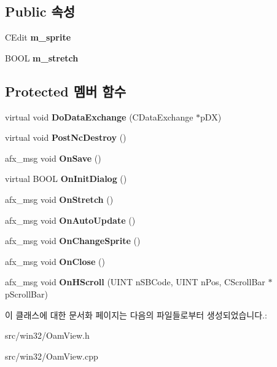 \subsection*{Public 속성}
\begin{DoxyCompactItemize}
\item 
\mbox{\label{class_oam_view_a808b936a1493d14a2a4bf27f3030af14}} 
C\+Edit {\bfseries m\+\_\+sprite}
\item 
\mbox{\label{class_oam_view_a0eeb8a1eeda8d53816c2696d70d61da4}} 
B\+O\+OL {\bfseries m\+\_\+stretch}
\end{DoxyCompactItemize}
\subsection*{Protected 멤버 함수}
\begin{DoxyCompactItemize}
\item 
\mbox{\label{class_oam_view_a0f3152b720294d92994d5240523fa64e}} 
virtual void {\bfseries Do\+Data\+Exchange} (C\+Data\+Exchange $\ast$p\+DX)
\item 
\mbox{\label{class_oam_view_ade58501064b40396703757df105b944b}} 
virtual void {\bfseries Post\+Nc\+Destroy} ()
\item 
\mbox{\label{class_oam_view_adb535d2f90a5c8edce8cb900e64a5854}} 
afx\+\_\+msg void {\bfseries On\+Save} ()
\item 
\mbox{\label{class_oam_view_a925c72977181efd7be81b302af7ed071}} 
virtual B\+O\+OL {\bfseries On\+Init\+Dialog} ()
\item 
\mbox{\label{class_oam_view_a60c3ddf70e740451daa8bb8a76661667}} 
afx\+\_\+msg void {\bfseries On\+Stretch} ()
\item 
\mbox{\label{class_oam_view_a5c3407e6ff2ffc673ea913d19883a4c8}} 
afx\+\_\+msg void {\bfseries On\+Auto\+Update} ()
\item 
\mbox{\label{class_oam_view_abe95dd5fc8a624b1ae5b3e4f4deb304a}} 
afx\+\_\+msg void {\bfseries On\+Change\+Sprite} ()
\item 
\mbox{\label{class_oam_view_aa09ba3520dcfe8357764cbbd170e7c9c}} 
afx\+\_\+msg void {\bfseries On\+Close} ()
\item 
\mbox{\label{class_oam_view_abe18288bced0938ce18be385de441bd4}} 
afx\+\_\+msg void {\bfseries On\+H\+Scroll} (U\+I\+NT n\+S\+B\+Code, U\+I\+NT n\+Pos, C\+Scroll\+Bar $\ast$p\+Scroll\+Bar)
\end{DoxyCompactItemize}


이 클래스에 대한 문서화 페이지는 다음의 파일들로부터 생성되었습니다.\+:\begin{DoxyCompactItemize}
\item 
src/win32/Oam\+View.\+h\item 
src/win32/Oam\+View.\+cpp\end{DoxyCompactItemize}
